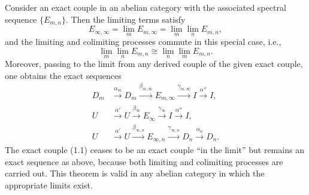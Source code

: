 Consider an exact couple in an abelian category with the associated spectral sequence $\{E_{m,n}\}$. Then the limiting terms satisfy
$$
E_{\infty,\infty} = \lim_m E_{m,\infty} = \lim_m \lim_n E_{m,n},
$$
and the limiting and colimiting processes commute in this special case, i.e.,
$$
\lim_m \lim_n E_{m,n} \cong \lim_n \lim_m E_{m,n}.
$$
Moreover, passing to the limit from any derived couple of the given exact couple, one obtains the exact sequences
$$
\begin{aligned}
D_m &\xrightarrow{\alpha_m} D_m \xrightarrow{\beta_{m,\infty}} E_{m,\infty} \xrightarrow{\gamma_{m,\infty}} I \xrightarrow{\alpha''} I, \\
U &\xrightarrow{\alpha'} U \xrightarrow{\beta_{\infty}} E_{\infty} \xrightarrow{\gamma_{\infty}} I \xrightarrow{\alpha''} I, \\
U &\xrightarrow{\alpha'} U \xrightarrow{\beta_{\infty,n}} E_{\infty,n} \xrightarrow{\gamma_{\infty,n}} D_n \xrightarrow{\alpha_n} D_n.
\end{aligned}
$$
The exact couple (1.1) ceases to be an exact couple ``in the limit'' but remains an exact sequence as above, because both limiting and colimiting processes are carried out. This theorem is valid in any abelian category in which the appropriate limits exist.
